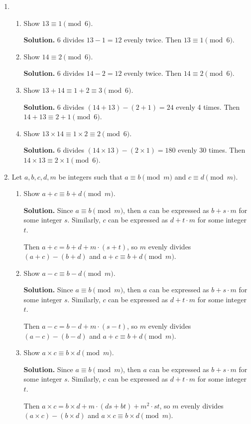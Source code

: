 \documentclass[11pt]{article}
\theoremstyle{definition}
\begin{document}
\begin{enumerate} \addtocounter{enumi}{\value{problem_count}}
\item \addtocounter{problem_count}{1}
\begin{enumerate}
\item Show $13 \equiv 1 \pmod{6}$.

\textbf{Solution.} 6 divides $13 - 1 = 12$ evenly twice. Then $13 \equiv 1 \pmod{6}$.

\item Show $14 \equiv 2 \pmod{6}$.

\textbf{Solution.} 6 divides $14 - 2 = 12$ evenly twice. Then $14 \equiv 2 \pmod{6}$.

\item Show $13 + 14 \equiv 1 + 2 \equiv 3 \pmod{6}$.

\textbf{Solution.} 6 divides $(14 + 13) - (2 + 1) = 24$ evenly 4 times. Then $14 + 13 \equiv 2 + 1 \pmod{6}$.

\item Show $13 \times 14 \equiv 1 \times 2 \equiv 2 \pmod{6}$.

\textbf{Solution.} 6 divides $(14 \times 13) - (2 \times 1) = 180$ evenly 30 times. Then $14 \times 13 \equiv 2 \times 1 \pmod{6}$.

\end{enumerate}

\item \addtocounter{problem_count}{1}
Let $a,b,c,d,m$ be integers such that $a \equiv b \pmod{m}$ and $c \equiv d \pmod{m}$.
\begin{enumerate}
\item Show $a + c \equiv b + d \pmod{m}$.

\textbf{Solution.}
Since $a \equiv b \pmod{m}$, then $a$ can be expressed as $b + s \cdot m$ for some integer $s$. Similarly, $c$ can be expressed as $d + t \cdot m$ for some integer $t$.

Then $a + c = b + d + m \cdot (s + t)$, so $m$ evenly divides $(a + c) - (b + d)$ and $a + c \equiv b + d \pmod{m}$.

\item Show $a - c \equiv b - d \pmod{m}$.

\textbf{Solution.}
Since $a \equiv b \pmod{m}$, then $a$ can be expressed as $b + s \cdot m$ for some integer $s$. Similarly, $c$ can be expressed as $d + t \cdot m$ for some integer $t$.

Then $a - c = b - d + m \cdot (s - t)$, so $m$ evenly divides $(a - c) - (b - d)$ and $a + c \equiv b + d \pmod{m}$.

\item Show $a \times c \equiv b \times d \pmod{m}$.

\textbf{Solution.}
Since $a \equiv b \pmod{m}$, then $a$ can be expressed as $b + s \cdot m$ for some integer $s$. Similarly, $c$ can be expressed as $d + t \cdot m$ for some integer $t$.

Then $a \times c = b \times d + m \cdot (ds + bt) + m^2 \cdot st$, so $m$ evenly divides $(a \times c) - (b \times d)$ and $a \times c \equiv b \times d \pmod{m}$.

\end{enumerate}
\end{enumerate}
\end{document}

